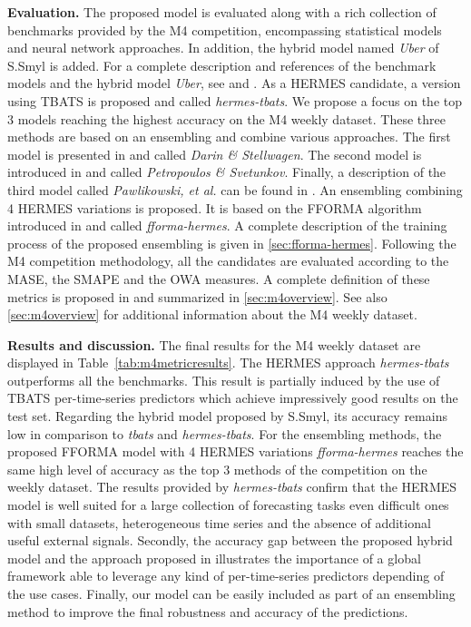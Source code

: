 \documentclass[review]{elsarticle}
\begin{document}
\textbf{Evaluation. } The proposed model is evaluated along with a rich collection of benchmarks provided by the M4 competition, encompassing statistical models and neural network approaches. In addition, the hybrid model named \textit{Uber} of S.Smyl is added. For a complete description and references of the benchmark models and the hybrid model \textit{Uber}, see \cite{makridakis2020} and \cite{smyl2020}. As a HERMES candidate, a version using TBATS is proposed and called \textit{hermes-tbats}. We propose a focus on the top 3 models reaching the highest accuracy on the M4 weekly dataset. These three methods are based on an ensembling and combine various approaches.
The first model is presented in \cite{darin2020} and called \textit{Darin \& Stellwagen}. The second model is introduced in \cite{petropoulos2020} and called \textit{Petropoulos \& Svetunkov}. Finally, a description of the third model  called \textit{Pawlikowski, et al.} can be found in \cite{pawlikowski2020}. An ensembling combining 4 HERMES variations is proposed. It is based on the FFORMA algorithm introduced in \cite{montero2020} and called \textit{fforma-hermes}. A complete description of the training process of the proposed ensembling is given in \ref{sec:fforma-hermes}. Following the M4 competition methodology, all the candidates are evaluated according to the MASE, the SMAPE and the OWA measures. A complete definition of these metrics is proposed in \cite{makridakis2020} and summarized in \ref{sec:m4overview}. See also \ref{sec:m4overview} for additional information about the M4 weekly dataset.

\textbf{Results and discussion. } The final results for the M4 weekly dataset are displayed in Table~\ref{tab:m4metricresults}. The HERMES approach \textit{hermes-tbats} outperforms all the benchmarks. This result is partially induced by the use of TBATS per-time-series predictors which achieve impressively good results on the test set. Regarding the hybrid model proposed by S.Smyl, its accuracy remains low in comparison to \textit{tbats} and  \textit{hermes-tbats}. For the ensembling methods, the proposed FFORMA model with 4 HERMES variations \textit{fforma-hermes} reaches the same high level of accuracy as the top 3 methods of the competition on the weekly dataset.
The results provided by \textit{hermes-tbats} confirm that the HERMES model is well suited for a large collection of forecasting tasks even difficult ones with small datasets, heterogeneous time series and the absence of  additional useful external signals. Secondly, the accuracy gap between the proposed hybrid model and the approach proposed in \cite{smyl2020} illustrates the importance of a global framework able to leverage any kind of per-time-series predictors depending of the use cases. Finally, our model can be easily included as part of an ensembling method to improve the final robustness and accuracy of the predictions.
\end{document}

